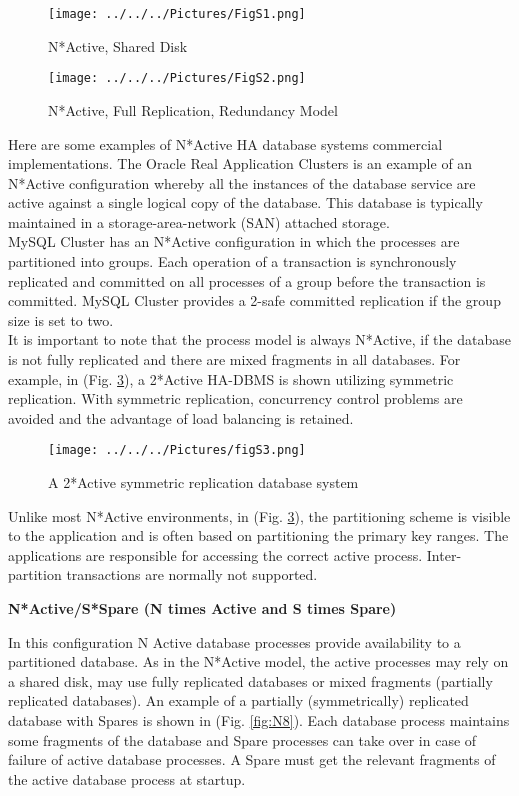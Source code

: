 \documentclass[english]{tktltiki2}
\theoremstyle{definition}
\theoremstyle{remark}
\begin{document}
\begin{figure}[h!]
\texttt{[image: ../../../Pictures/FigS1.png]} 
\caption{N*Active, Shared Disk \cite{inproceedings}}
\label{fig:N5}
\end{figure}

\begin{figure}[h!]
\texttt{[image: ../../../Pictures/FigS2.png]} 
\caption{N*Active, Full Replication, Redundancy Model \cite{inproceedings}}
\label{fig:N6}
\end{figure}

\pagebreak
Here are some examples of N*Active HA database systems commercial implementations.
The Oracle Real Application Clusters \cite{RACOra} is an example of an N*Active configuration whereby all the instances of the database service are active against a single logical copy of the database. This database is typically maintained in a storage-area-network (SAN) attached storage.\\
MySQL Cluster \cite{MySQL}\cite{MySQL1} has an N*Active configuration in which the processes are partitioned into groups. Each operation of a transaction is synchronously replicated and committed on all processes of a group before the transaction is committed. MySQL Cluster provides a 2-safe committed replication if the group size is set to two.\\
It is important to note that the process model is always N*Active, if the database is not fully replicated and there are mixed fragments in all databases. For example, in (Fig. \ref{fig:N7}), a 2*Active HA-DBMS is shown utilizing symmetric replication. With symmetric replication, concurrency control problems are avoided and the advantage of load balancing is retained.

\begin{figure}[h!]
\texttt{[image: ../../../Pictures/figS3.png]} 
\caption{A 2*Active symmetric replication database system \cite{inproceedings}}
\label{fig:N7}
\end{figure}

\pagebreak
Unlike most N*Active environments, in (Fig. \ref{fig:N7}), the partitioning scheme is visible to the application and is often based on partitioning the primary key ranges. The applications are responsible for accessing the correct active process. Inter-partition transactions are normally not supported.

\begin{flushleft}
\textbf{N*Active/S*Spare (N times Active and S times Spare)}
\end{flushleft}
In this configuration N Active database processes provide availability to a partitioned database. As in the N*Active model, the active processes may rely on a shared disk, may use fully replicated databases or mixed fragments (partially replicated databases).
An example of a partially (symmetrically) replicated database with Spares is
shown in (Fig. \ref{fig:N8}).
Each database process maintains some fragments of the database and Spare processes can take over in case of failure of active database processes. A Spare must get the relevant fragments of the active database process at startup.
\end{document}
